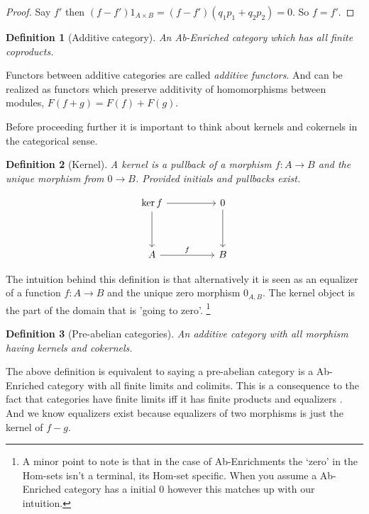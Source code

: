 \documentclass[12pt]{article}
\numberwithin{equation}{section}
\newtheorem{definition}{Definition}[section]
\begin{document}
\begin{appendices}
\begin{proof}
		Say $f'$ then $(f-f')1_{A \times B}=(f-f')(q_1p_1+q_2p_2)=0$. So $f=f'$.
		
		
	\end{proof}
	
	
	\begin{definition}[Additive category]
		An Ab-Enriched category which has all finite coproducts.
	\end{definition}
	
	Functors between additive categories are called \textit{additive functors}. And can be realized as functors which preserve additivity of homomorphisms between modules, $F(f+g)=F(f)+F(g).$
	
	Before proceeding further it is important to think about kernels and cokernels in the categorical sense.
	\begin{definition}[Kernel]
		A kernel is a pullback of a morphism $f:A \to B$ and the unique morphism from $0 \to B$. Provided initials and pullbacks exist.
		
		\[\begin{tikzcd}
			{\ker f} && 0 \\
			\\
			A && B
			\arrow["f", from=3-1, to=3-3]
			\arrow[from=1-3, to=3-3]
			\arrow[from=1-1, to=1-3]
			\arrow[from=1-1, to=3-1]
		\end{tikzcd}\]
	\end{definition}
	The intuition behind this definition is that alternatively it is seen as an equalizer of a function $f:A \to B$ and the unique zero morphism $0_{A,B}$. The kernel object is the part of the domain that is 'going to zero'. \footnote{A minor point to note is that in the case of Ab-Enrichments the `zero' in the Hom-sets isn't a terminal, its Hom-set specific. When you assume a Ab-Enriched category has a initial 0 however this matches up with our intuition.}
	
	
	\begin{definition}[Pre-abelian categories]
		An additive category with all morphism having kernels and cokernels.
	\end{definition}
	The above definition is equivalent to saying a pre-abelian category is a Ab-Enriched category with all finite limits and colimits. This is a consequence to the fact that categories have finite limits iff it has finite products and equalizers \cite[Prop.~5.21]{Awodey}. And we know equalizers exist because equalizers of two morphisms is just the kernel of $f-g$.
	
	
	

\end{appendices}
\end{document}
